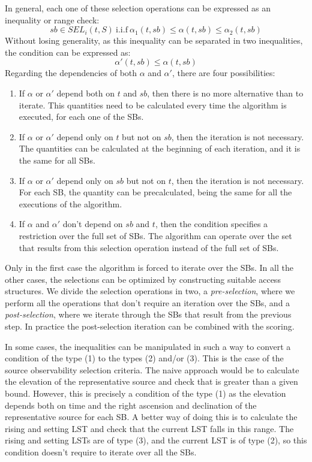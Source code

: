 \documentclass{article}
\begin{document}
In general, each one of these selection operations can be expressed as
an inequality or range check:
$$
sb \in SEL_i(t,S) \ \mathrm{i.i.f} \  \alpha_1 (t,sb) \leq \alpha(t,sb) \leq \alpha_2 (t,sb) 
$$ 
Without losing generality, as this inequality can be separated in two inequalities, the
condition can be expressed as:
$$
\alpha'(t,sb) \leq \alpha(t,sb)
$$ 
Regarding the dependencies of both $\alpha$ and $\alpha'$, there are four possibilities:
\begin{enumerate}
\item If $\alpha$ or $\alpha'$ depend both on $t$ and $sb$, then there is no more
alternative than to iterate. This quantities need to be calculated every time the
algorithm is executed, for each one of the SBs.
\item If $\alpha$ or $\alpha'$ depend only on $t$ but not on $sb$, then the iteration is not
necessary. The quantities can be calculated at the beginning of each iteration, and it is
the same for all SBs.
\item If $\alpha$ or $\alpha'$ depend only on $sb$ but not on $t$, then the iteration is
not necessary. For each SB, the quantity can be precalculated, being the same for all
the executions of the algorithm.
\item If $\alpha$ and $\alpha'$ don't depend on $sb$ and $t$, then the condition
specifies a restriction over the full set of SBs. The algorithm can operate over the
set that results from this selection operation instead of the full set of SBs. 
\end{enumerate}

Only in the first case the algorithm is forced to iterate over the SBs. In all the
other cases, the selections can be optimized by constructing suitable access
structures. We divide the selection operations in two, a {\it pre-selection}, where
we perform all the operations that don't require an iteration over the SBs, and a
{\it post-selection}, where we iterate through the SBs that result from the previous
step. In practice the post-selection iteration can be combined with the scoring.

In some cases, the inequalities can be manipulated in such a way to convert a condition
of the type (1) to the types (2) and/or (3). This is the case of the source observability
selection criteria. The naive approach would be to calculate the elevation of the
representative source and check that is greater than a given bound. However, this
is precisely a condition of the type (1) as the elevation depends both on time and
the right ascension and declination of the representative source for each SB.
A better way of doing this is
to calculate the rising and setting LST and check that the current LST falls in this
range. The rising and setting LSTs are of type (3), and the current LST is of type (2),
so this condition doesn't require to iterate over all the SBs.  
\end{document}
